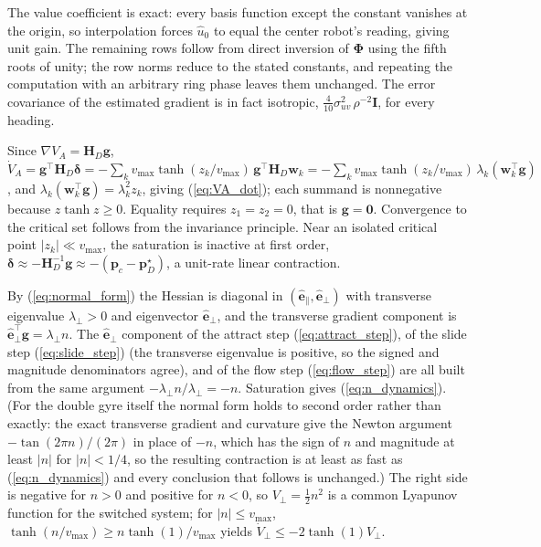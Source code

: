 \documentclass[lettersize,journal]{IEEEtran}
\begin{document}
\begin{IEEEproof}
The value coefficient is exact: every basis function except the constant
vanishes at the origin, so interpolation forces $\hat{u}_0$ to equal the
center robot's reading, giving unit gain. The remaining rows follow from
direct inversion of $\boldsymbol{\Phi}$ using the fifth roots of unity;
the row norms reduce to the stated constants, and repeating the
computation with an arbitrary ring phase leaves them unchanged. The
error covariance of the estimated gradient is in fact isotropic,
$\tfrac{4}{10}\sigma_{uv}^2\,\rho^{-2}\mathbf{I}$, for every heading.
\end{IEEEproof}

\begin{IEEEproof}
Since $\nabla V_A = \mathbf{H}_D \mathbf{g}$,
$\dot{V}_A = \mathbf{g}^\top \mathbf{H}_D \boldsymbol{\delta}
= -\sum_k v_{\max} \tanh(z_k/v_{\max})\,
\mathbf{g}^\top \mathbf{H}_D \mathbf{w}_k
= -\sum_k v_{\max} \tanh(z_k/v_{\max})\,\lambda_k
(\mathbf{w}_k^\top\mathbf{g})$, and $\lambda_k(\mathbf{w}_k^\top
\mathbf{g}) = \lambda_k^2 z_k$, giving (\ref{eq:VA_dot}); each summand
is nonnegative because $z\tanh z \geq 0$. Equality requires $z_1 = z_2 =
0$, that is $\mathbf{g} = \mathbf{0}$. Convergence to the critical set
follows from the invariance principle. Near an isolated critical point
$|z_k| \ll v_{\max}$, the saturation is inactive at first order,
$\boldsymbol{\delta} \approx -\mathbf{H}_D^{-1}\mathbf{g} \approx
-(\mathbf{p}_c - \mathbf{p}^\star_D)$, a unit-rate linear contraction.
\end{IEEEproof}

\begin{IEEEproof}
By (\ref{eq:normal_form}) the Hessian is diagonal in
$(\hat{\mathbf{e}}_\parallel, \hat{\mathbf{e}}_\perp)$ with transverse
eigenvalue $\lambda_\perp > 0$ and eigenvector
$\hat{\mathbf{e}}_\perp$, and the transverse gradient component is
$\hat{\mathbf{e}}_\perp^\top \mathbf{g} = \lambda_\perp n$. The
$\hat{\mathbf{e}}_\perp$ component of the attract step
(\ref{eq:attract_step}), of the slide step (\ref{eq:slide_step}) (the
transverse eigenvalue is positive, so the signed and magnitude
denominators agree), and of the flow step (\ref{eq:flow_step}) are all
built from the same argument $-\lambda_\perp n / \lambda_\perp = -n$.
Saturation gives (\ref{eq:n_dynamics}). (For the double gyre itself the
normal form holds to second order rather than exactly: the exact
transverse gradient and curvature give the Newton argument
$-\tan(2\pi n)/(2\pi)$ in place of $-n$, which has the sign of $n$ and
magnitude at least $|n|$ for $|n| < 1/4$, so the resulting contraction
is at least as fast as (\ref{eq:n_dynamics}) and every conclusion that
follows is unchanged.) The right side is negative for $n > 0$ and
positive for $n < 0$, so $V_\perp = \tfrac{1}{2}n^2$ is a common
Lyapunov function for the switched system; for $|n| \leq v_{\max}$,
$\tanh(n/v_{\max}) \geq n \tanh(1)/v_{\max}$ yields $\dot{V}_\perp \leq
-2\tanh(1) V_\perp$.
\end{IEEEproof}
\end{document}
